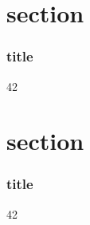\documentclass{beamer}
\begin{document}
{
\AtBeginSection{}
\section{section}
\begin{frame}
\frametitle{title}
42
\end{frame}
}

\section{section}
\begin{frame}
\frametitle{title}
42
\end{frame}
\end{document}
